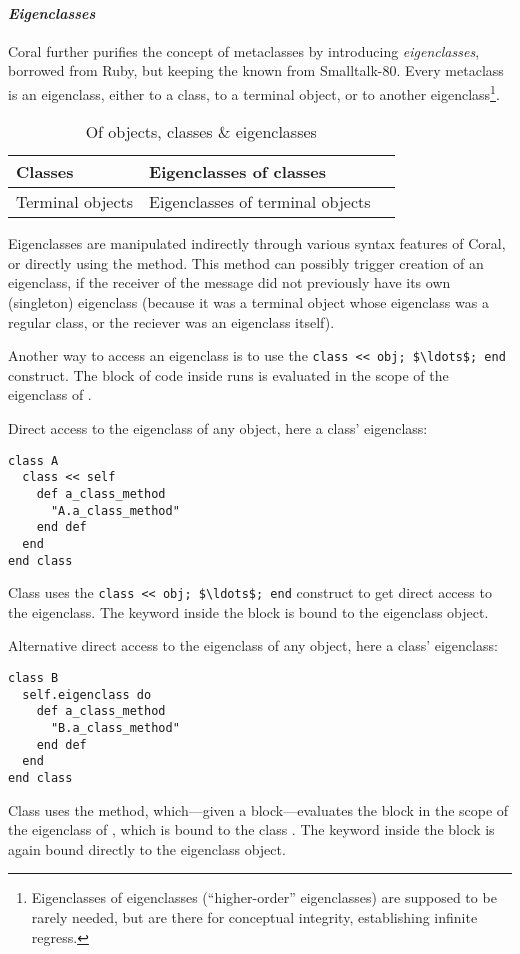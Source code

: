 \paragraph{\em Eigenclasses}
Coral further purifies the concept of metaclasses by introducing {\em eigenclasses}, borrowed from Ruby, but keeping the  known from Smalltalk-80. Every metaclass is an eigenclass, either to a class, to a terminal object, or to another eigenclass\footnote{Eigenclasses of eigenclasses (``higher-order'' eigenclasses) are supposed to be rarely needed, but are there for conceptual integrity, establishing infinite regress.}. 

\begin{table}[ht]
  \centering
  \caption{Of objects, classes \& eigenclasses}
  \renewcommand{\arraystretch}{1.7}
  \begin{tabular}{ | >{\centering}m{3.5cm} | >{\centering}m{3.5cm} | >{\centering\arraybackslash}m{6cm} | }
  	\hline
    Classes & Eigenclasses of classes & \multirow{2}{*}{Eigenclasses of eigenclasses} \\ \cline{1-2}
    Terminal objects & Eigenclasses of terminal objects & \\
    \hline
  \end{tabular}
\end{table}

Eigenclasses are manipulated indirectly through various syntax features of Coral, or directly using the  method. This method can possibly trigger creation of an eigenclass, if the receiver of the  message did not previously have its own (singleton) eigenclass (because it was a terminal object whose eigenclass was a regular class, or the reciever was an eigenclass itself). 

Another way to access an eigenclass is to use the \lstinline!class << obj; $\ldots$; end! construct. The block of code inside runs is evaluated in the scope of the eigenclass of . 

\example Direct access to the eigenclass of any object, here a class' eigenclass:
\begin{lstlisting}
class A
  class << self
    def a_class_method
      "A.a_class_method"
    end def
  end
end class
\end{lstlisting}
Class  uses the \lstinline!class << obj; $\ldots$; end! construct to get direct access to the eigenclass. The keyword  inside the block is bound to the eigenclass object. 

\example Alternative direct access to the eigenclass of any object, here a class' eigenclass:
\begin{lstlisting}
class B
  self.eigenclass do
    def a_class_method
      "B.a_class_method"
    end def
  end
end class
\end{lstlisting}
Class  uses the  method, which---given a block---evaluates the block in the scope of the eigenclass of , which is bound to the class . The keyword  inside the block is again bound directly to the eigenclass object. 

